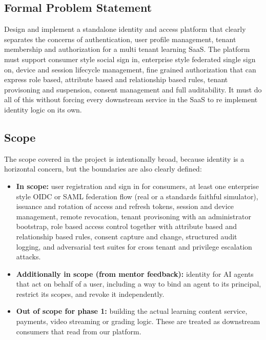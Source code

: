 \documentclass[11pt,a4paper]{article}
\begin{document}
\subsection{Formal Problem Statement}

Design and implement a standalone identity and access platform that clearly separates the concerns of authentication, user profile management, tenant membership and authorization for a multi tenant learning SaaS. The platform must support consumer style social sign in, enterprise style federated single sign on, device and session lifecycle management, fine grained authorization that can express role based, attribute based and relationship based rules, tenant provisoning and suspension, consent management and full auditability. It must do all of this without forcing every downstream service in the SaaS to re implement identity logic on its own.

\subsection{Scope}

The scope covered in the project is intentionally broad, because identity is a horizontal concern, but the boundaries are also clearly defined:

\begin{itemize}[leftmargin=1.5em,itemsep=2pt]
    \item \textbf{In scope:} user registration and sign in for consumers, at least one enterprise style OIDC or SAML federation flow (real or a standards faithful simulator), issuance and rotation of access and refresh tokens, session and device management, remote revocation, tenant provisoning with an administrator bootstrap, role based access control together with attribute based and relationship based rules, consent capture and change, structured audit logging, and adversarial test suites for cross tenant and privilege escalation attacks.
    \item \textbf{Additionally in scope (from mentor feedback):} identity for AI agents that act on behalf of a user, including a way to bind an agent to its principal, restrict its scopes, and revoke it independently.
    \item \textbf{Out of scope for phase 1:} building the actual learning content service, payments, video streaming or grading logic. These are treated as downstream consumers that read from our platform.
\end{itemize}
\end{document}
